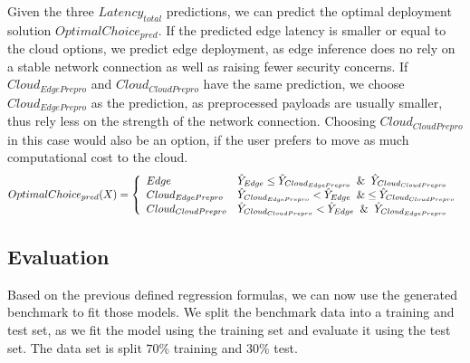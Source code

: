 Given the three $Latency_{total}$ predictions, we can predict the optimal deployment solution $OptimalChoice_{pred}$.
If the predicted edge latency is smaller or equal to the cloud options, we predict edge deployment, as edge inference does no rely on a stable network connection as well as raising fewer security concerns.
If $Cloud_{EdgePrepro}$ and $Cloud_{CloudPrepro}$ have the same prediction, we choose $Cloud_{EdgePrepro}$ as the prediction, as preprocessed payloads are usually smaller, thus rely less on the strength of the network connection. Choosing $Cloud_{CloudPrepro}$ in this case would also be an option, if the user prefers to move as much computational cost to the cloud.
\begin{equation*}
\begin{gathered}
OptimalChoice_{pred}(X) = \left\{\begin{array}{ll}
Edge  & \hat{Y}_{Edge} \leq \hat{Y}_{Cloud_{EdgePrepro}} \And \hat{Y}_{Cloud_{CloudPrepro}}\\
Cloud_{EdgePrepro}  &\hat{Y}_{Cloud_{EdgePrepro}} <   \hat{Y}_{Edge} \And \leq \hat{Y}_{Cloud_{CloudPrepro}}\\
Cloud_{CloudPrepro} & \hat{Y}_{Cloud_{CloudPrepro}} < \hat{Y}_{Edge} \And \hat{Y}_{Cloud_{EdgePrepro}}
\end{array}\right.
\end{gathered}
\end{equation*}

\subsection{Evaluation}
Based on the previous defined regression formulas, we can now use the generated benchmark to fit those models.
We split the benchmark data into a training and test set, as we fit the model using the training set and evaluate it using the test set.
The data set is split $70\%$ training and $30\%$ test.

